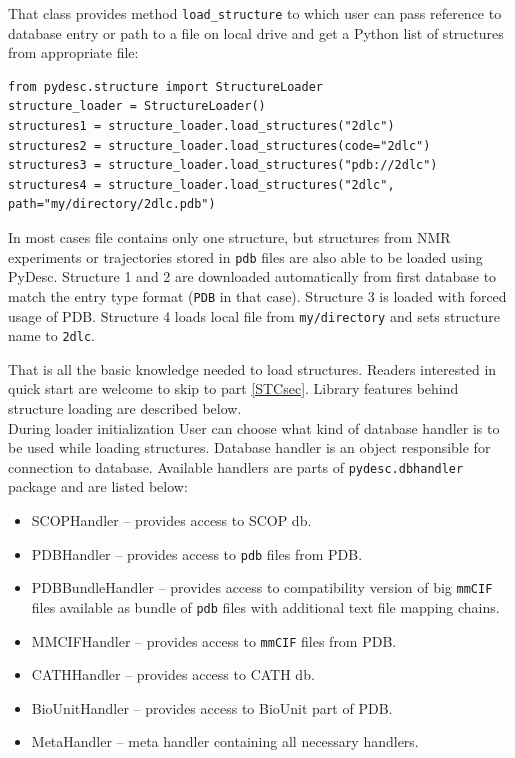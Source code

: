 \documentclass{article}
\begin{document}
    That class provides method \texttt{load\_structure} to which user can pass reference to database entry or path to a file on local drive and get a Python list of structures from appropriate file:

\begin{lstlisting}
from pydesc.structure import StructureLoader
structure_loader = StructureLoader()
structures1 = structure_loader.load_structures("2dlc")
structures2 = structure_loader.load_structures(code="2dlc")
structures3 = structure_loader.load_structures("pdb://2dlc")
structures4 = structure_loader.load_structures("2dlc", path="my/directory/2dlc.pdb")
\end{lstlisting}

    In most cases file contains only one structure, but structures from NMR experiments or trajectories stored in \texttt{pdb} files are also able to be loaded using PyDesc.
    Structure 1 and 2 are downloaded automatically from first database to match the entry type format (\texttt{PDB} in that case). Structure 3 is loaded with forced usage of PDB. Structure 4 loads local file from \texttt{my/directory} and sets structure name to \texttt{2dlc}.
    
    That is all the basic knowledge needed to load structures. Readers interested in quick start are welcome to skip to part \ref{STCsec}. Library features behind structure loading are described below.\\

    During loader initialization User can choose what kind of database handler is to be used while loading structures. Database handler is an object responsible for connection to database. Available handlers are parts of \texttt{pydesc.dbhandler} package and are listed below:
\begin{itemize}
    \item SCOPHandler -- provides access to SCOP db.
    \item PDBHandler -- provides access to \texttt{pdb} files from PDB.
    \item PDBBundleHandler -- provides access to compatibility version of big \texttt{mmCIF} files available as bundle of \texttt{pdb} files with additional text file mapping chains.
    \item MMCIFHandler -- provides access to \texttt{mmCIF} files from PDB.
    \item CATHHandler -- provides access to CATH db.
    \item BioUnitHandler -- provides access to BioUnit part of PDB.
    \item MetaHandler -- meta handler containing all necessary handlers.
\end{itemize}
\end{document}
